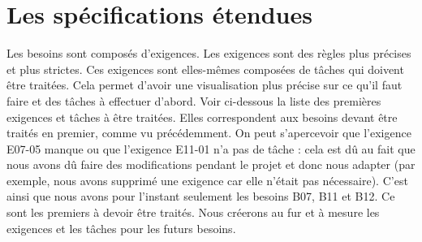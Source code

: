 \documentclass[a4paper,12pt]{article}
\begin{document}

\section{Les spécifications étendues}

Les besoins sont composés d'exigences. Les exigences sont des règles plus précises et plus strictes. Ces exigences sont elles-mêmes composées de tâches qui doivent être traitées. Cela permet d'avoir une visualisation plus précise sur ce qu'il faut faire et des tâches à effectuer d'abord. Voir ci-dessous la liste des premières exigences et tâches à être traitées. Elles correspondent aux besoins devant être traités en premier, comme vu précédemment. On peut s'apercevoir que l'exigence E07-05 manque ou que l'exigence E11-01 n'a pas de tâche : cela est dû au fait que nous avons dû faire des modifications pendant le projet et donc nous adapter (par exemple, nous avons supprimé une exigence car elle n'était pas nécessaire). C'est ainsi que nous avons pour l'instant seulement les besoins B07, B11 et B12. Ce sont les premiers à devoir être traités. Nous créerons au fur et à mesure les exigences et les tâches pour les futurs besoins.
\end{document}
